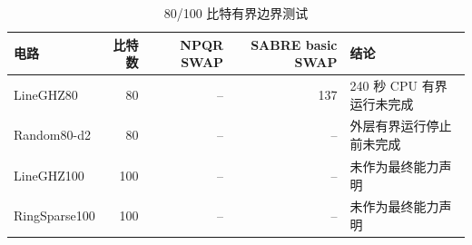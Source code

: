 \begin{table}[H]
  \centering
  \caption{80/100 比特有界边界测试}
  \label{tab:large-scale-boundary}
  \begin{tabularx}{\textwidth}{lrrrY}
    \toprule
    电路 & 比特数 & NPQR SWAP & SABRE basic SWAP & 结论 \\
    \midrule
    LineGHZ80 & 80 & -- & 137 & 240 秒 CPU 有界运行未完成 \\
    Random80-d2 & 80 & -- & -- & 外层有界运行停止前未完成 \\
    LineGHZ100 & 100 & -- & -- & 未作为最终能力声明 \\
    RingSparse100 & 100 & -- & -- & 未作为最终能力声明 \\
    \bottomrule
  \end{tabularx}
\end{table}

